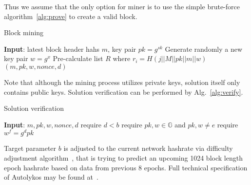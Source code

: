 Thus we assume that the only option for miner is to use the simple brute-force algorithm~\ref{alg:prove} to
create a valid block.

\begin{algorithm}[H]
    \caption{Block mining}
    \label{alg:prove}
    \begin{algorithmic}[1]
        \State \textbf{Input}: latest block header hahs $m$, key pair $pk=g^{sk}$
        \State Generate randomly a new key pair $w=g^x$
        \State Pre-calculate list $R$ where $r_i=H(j||M||pk||m||w)$
        \State \Return $(m,pk,w,nonce,d)$
        \EndIf
        \EndWhile
    \end{algorithmic}
\end{algorithm}

Note that although the mining process utilizes private keys, solution itself
only contains public keys. Solution verification can be performed by Alg.~\ref{alg:verify}.

\begin{algorithm}[H]
    \caption{Solution verification}
    \label{alg:verify}
    \begin{algorithmic}[1]
        \State \textbf{Input}: $m,pk,w,nonce,d$
        \State require $d < b$
        \State require $pk,w\in \mathbb{G}$ and $pk,w \ne e$
        \State require $w^f = g^dpk$
    \end{algorithmic}
\end{algorithm}

Target parameter $b$ is adjusted to the current network hashrate via difficulty adjustment
algorithm~\cite{meshkov2017short}, that is trying to predict an upcoming 1024 block length
epoch hashrate based on data from previous 8 epochs.
Full technical specification of Autolykos may be found at~\cite{Ergopow}.
